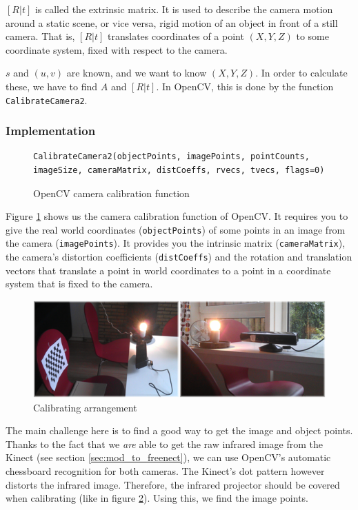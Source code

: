 $\left[R|t\right]$ is called the extrinsic matrix. It is used to describe the camera motion around a static scene, or vice versa, rigid motion of an object in front of a still camera. That is, $\left[R|t\right]$ translates coordinates of a point $\left( X, Y, Z \right)$ to some coordinate system, fixed with respect to the camera.

$s$ and $\left( u, v \right)$ are known, and we want to know $\left( X, Y, Z \right)$. In order to calculate these, we have to find $A$ and $\left[R|t\right]$. In OpenCV, this is done by the function \verb|CalibrateCamera2|.

\subsubsection{Implementation}
\begin{figure}[H]
\begin{lstlisting}
CalibrateCamera2(objectPoints, imagePoints, pointCounts, imageSize, cameraMatrix, distCoeffs, rvecs, tvecs, flags=0)
\end{lstlisting}
\caption{OpenCV camera calibration function}
\label{code:calibratecamera2}
\end{figure}

Figure \ref{code:calibratecamera2} shows us the camera calibration function of OpenCV. It requires you to give the real world coordinates (\verb|objectPoints|) of some points in an image from the camera (\verb|imagePoints|). It provides you the intrinsic matrix (\verb|cameraMatrix|), the camera's distortion coefficients (\verb|distCoeffs|) and the rotation and translation vectors that translate a point in world coordinates to a point in a coordinate system that is fixed to the camera.

\begin{figure}[H]
\centering
\includegraphics[scale=0.6]{images/calibrating.png}
\caption{Calibrating arrangement}
\label{fig:calibrating}
\end{figure}

The main challenge here is to find a good way to get the image and object points. Thanks to the fact that we \emph{are} able to get the raw infrared image from the Kinect (see section \ref{sec:mod_to_freenect}), we can use OpenCV's automatic chessboard recognition for both cameras. The Kinect's dot pattern however distorts the infrared image. Therefore, the infrared projector should be covered when calibrating (like in figure \ref{fig:calibrating}).  Using this, we find the image points.

